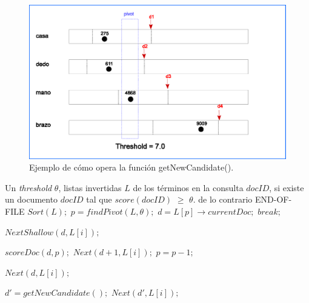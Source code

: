 \begin{figure}[tp]
\centering
\includegraphics[scale=.75]{images/get_new_candidate.eps}
\caption{Ejemplo de cómo opera la función getNewCandidate().}
\label{fig:getNewCandidate}
\end{figure}

\begin{algorithm}[tp]
\caption{\em $BMW(\theta, L, docID): Block Max Wand$}
\label{alg:bmw}
\begin{algorithmic}[1]
\REQUIRE Un \textit{threshold} $\theta$, listas invertidas $L$ de los términos en la consulta
\ENSURE $docID$, si existe un documento $docID$ tal que $score(docID)$ $\geq$ $\theta$. de lo contrario END-OF-FILE
	\STATE $Sort(L);$
	\STATE $p = findPivot(L,\theta);$
	\STATE $d = L[p] \rightarrow currentDoc;$
  		\STATE $break;$
	\ENDIF
		
		\STATE $NextShallow(d, L[i]);$
	\ENDFOR
	
			\STATE $scoreDoc(d, p);$
				\STATE $Next(d + 1, L[i]);$
			\ENDFOR
		\ELSE
				\STATE $p = p - 1;$			
			\ENDWHILE
			
				\STATE $Next(d, L[i]);$
			\ENDFOR
			
		\ENDIF		
	\ELSE	
		\STATE $d' = getNewCandidate();$
			\STATE $Next(d', L[i]);$
		\ENDFOR
	\ENDIF
	
\ENDWHILE

\end{algorithmic}
\end{algorithm}